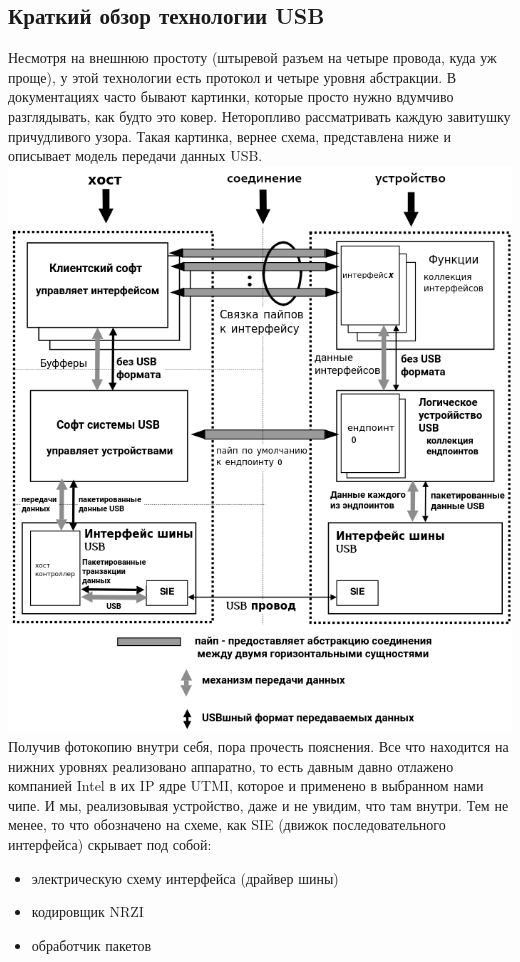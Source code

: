 \documentclass[12pt,a4paper]{article}
\begin{document}
\subsection{Краткий обзор технологии USB}
    Несмотря на внешнюю простоту (штыревой разъем на четыре провода, куда уж
    проще), у этой технологии есть протокол и четыре уровня абстракции.
    В документациях часто бывают картинки, которые просто нужно вдумчиво
    разглядывать, как будто это ковер. Неторопливо рассматривать каждую
    завитушку причудливого узора. Такая картинка, вернее схема, представлена
    ниже и описывает модель передачи данных USB.\\
\includegraphics[width=15cm]{protocol.png}\\
    Получив фотокопию внутри себя, пора прочесть пояснения.
    Все что находится на нижних уровнях реализовано аппаратно, то есть давным
    давно отлажено компанией Intel в их IP ядре UTMI, которое и применено
    в выбранном нами чипе. И мы, реализовывая устройство,
    даже и не увидим, что там внутри. Тем не менее, то
    что обозначено на схеме, как SIE (движок последовательного интерфейса)
    скрывает под собой:
\begin{itemize}
    \item электрическую схему интерфейса (драйвер шины)
    \item кодировщик NRZI
    \item обработчик пакетов
\end{itemize}
\end{document}
